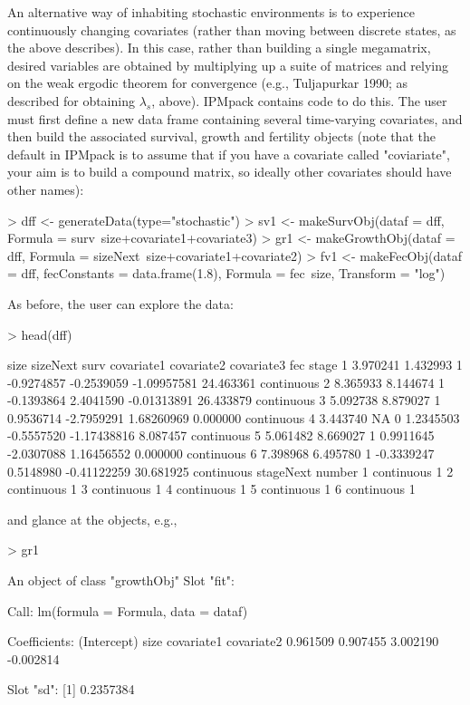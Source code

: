\documentclass{article}
\begin{document}
An alternative way of inhabiting stochastic environments is to experience continuously changing covariates (rather
than moving between discrete states, as the above describes). In this case, rather than building a single megamatrix, desired variables are obtained by multiplying up a suite of matrices and relying on the weak ergodic theorem for convergence (e.g., Tuljapurkar 1990; as described for obtaining $\lambda_s$, above). IPMpack contains code to do this. The user must first define a new data frame containing several time-varying covariates, and then build the associated survival, growth and fertility objects (note that the default in IPMpack is to assume that if you have a covariate called "coviariate", your aim is to build a compound matrix, so ideally other covariates should have other names):
\begin{Schunk}
\begin{Sinput}
> dff <- generateData(type="stochastic")
> sv1 <- makeSurvObj(dataf = dff, 
                            Formula = surv~size+covariate1+covariate3)
> gr1 <- makeGrowthObj(dataf = dff, 
                               Formula = sizeNext~size+covariate1+covariate2)
> fv1 <- makeFecObj(dataf = dff, fecConstants = data.frame(1.8), 
                    Formula = fec~size, Transform = "log")
\end{Sinput}
\end{Schunk}
As before, the user can explore the data: 
\begin{Schunk}
\begin{Sinput}
> head(dff)
\end{Sinput}
\begin{Soutput}
      size sizeNext surv covariate1 covariate2  covariate3       fec      stage
1 3.970241 1.432993    1 -0.9274857 -0.2539059 -1.09957581 24.463361 continuous
2 8.365933 8.144674    1 -0.1393864  2.4041590 -0.01313891 26.433879 continuous
3 5.092738 8.879027    1  0.9536714 -2.7959291  1.68260969  0.000000 continuous
4 3.443740       NA    0  1.2345503 -0.5557520 -1.17438816  8.087457 continuous
5 5.061482 8.669027    1  0.9911645 -2.0307088  1.16456552  0.000000 continuous
6 7.398968 6.495780    1 -0.3339247  0.5148980 -0.41122259 30.681925 continuous
   stageNext number
1 continuous      1
2 continuous      1
3 continuous      1
4 continuous      1
5 continuous      1
6 continuous      1
\end{Soutput}
\end{Schunk}
and glance at the objects, e.g., 
\begin{Schunk}
\begin{Sinput}
> gr1
\end{Sinput}
\begin{Soutput}
An object of class "growthObj"
Slot "fit":

Call:
lm(formula = Formula, data = dataf)

Coefficients:
(Intercept)         size   covariate1   covariate2  
   0.961509     0.907455     3.002190    -0.002814  


Slot "sd":
[1] 0.2357384
\end{Soutput}
\end{Schunk}
\end{document}
